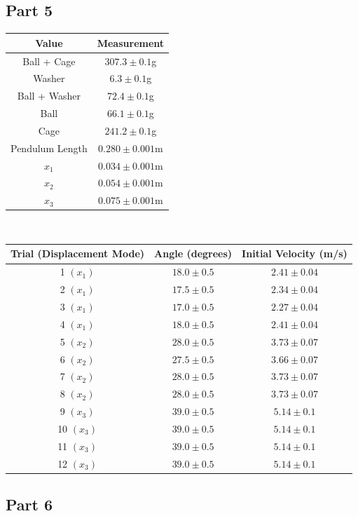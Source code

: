 \documentclass[8pt]{extarticle}
\begin{document}
{\subsection*{Part 5}
\begin{center}
	\renewcommand{\arraystretch}{1.5}
	\begin{tabular}{c|c}
		Value & Measurement\\
		\hline
		Ball + Cage & $307.3\pm 0.1$g\\
		Washer & $6.3\pm 0.1$g\\
		Ball + Washer & $72.4\pm 0.1$g\\
		Ball & $66.1\pm 0.1$g\\
		Cage & $241.2\pm 0.1$g\\
		Pendulum Length & $0.280\pm 0.001$m\\
		$x_1$ & $0.034\pm 0.001$m\\
		$x_2$ & $0.054\pm 0.001$m\\
		$x_3$ & $0.075\pm 0.001$m
	\end{tabular} \\
	\begin{tabular}{c|c|c}
		Trial (Displacement Mode) & Angle (degrees) & Initial Velocity (m/s)\\
		\hline
		1 $(x_1)$ & $18.0\pm 0.5$ & $2.41\pm 0.04$ \\
		2 $(x_1)$ & $17.5\pm 0.5$ & $2.34\pm 0.04$ \\
		3 $(x_1)$ & $17.0\pm 0.5$ & $2.27\pm 0.04$ \\
		4 $(x_1)$ & $18.0 \pm 0.5$ & $2.41\pm 0.04$ \\
		\hline
		5 $(x_2)$ & $28.0\pm 0.5$ & $3.73\pm 0.07$\\
		6 $(x_2)$ & $27.5\pm 0.5$ & $3.66\pm 0.07$\\
		7 $(x_2)$ & $28.0\pm 0.5$ & $3.73\pm 0.07$\\
		8 $(x_2)$ & $28.0\pm 0.5$ & $3.73\pm 0.07$\\
		\hline
		9 $(x_3)$ & $39.0\pm 0.5$ & $5.14\pm 0.1$\\
		10 $(x_3)$ & $39.0\pm 0.5$ & $5.14\pm 0.1$\\
		11 $(x_3)$ & $39.0\pm 0.5$ & $5.14\pm 0.1$\\
		12 $(x_3)$ & $39.0\pm 0.5$ & $5.14\pm 0.1$\\
	\end{tabular}
\end{center}
\subsection*{Part 6}
}
\end{document}
